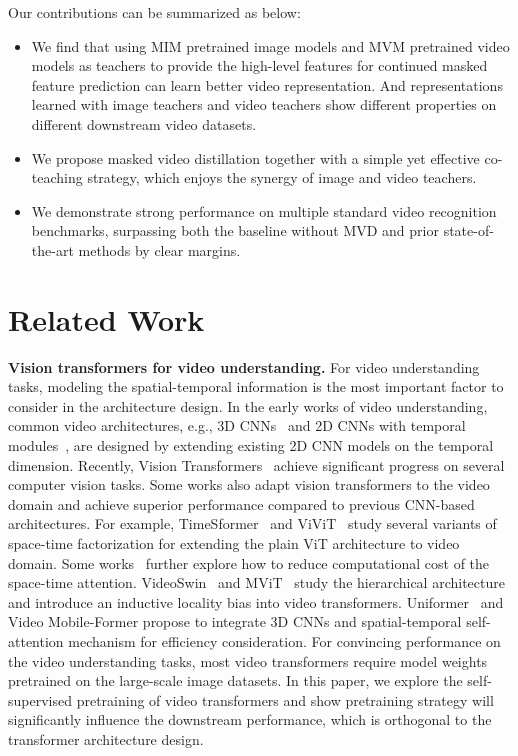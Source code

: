 \documentclass[10pt,twocolumn,letterpaper]{article}
\begin{document}
Our contributions can be summarized as below:
\begin{itemize}
    \item We find that using MIM pretrained image models and MVM pretrained video models as teachers to provide the high-level features for continued masked feature prediction can learn better video representation. And representations learned with image teachers and video teachers show different properties on different downstream video datasets.
    \item We propose masked video distillation together with a simple yet effective co-teaching strategy, which enjoys the synergy of image and video teachers.
    \item We demonstrate strong performance on multiple standard video recognition benchmarks, surpassing both the baseline without MVD and prior state-of-the-art methods by clear margins.
\end{itemize}
 

\section{Related Work}
\label{sec:related_work}

\vspace{0.05in}
\noindent \textbf{Vision transformers for video understanding.} For video understanding tasks, modeling the spatial-temporal information is the most important factor to consider in the architecture design. In the early works of video understanding, common video architectures, e.g., 3D CNNs~\cite{quovadis,c3d,r21d,slowfast,x3d} and 2D CNNs with temporal modules~\cite{recurrentdonahue,recurrentjoe,twostream,tsn,tsm}, are designed by extending existing 2D CNN models on the temporal dimension. Recently, Vision Transformers~\cite{vit,liu2021swin,dong2022cswin} achieve significant progress on several computer vision tasks. Some works also adapt vision transformers to the video domain and achieve superior performance compared to previous CNN-based architectures. For example, TimeSformer~\cite{timesformer} and ViViT~\cite{arnab2021vivit}   study several variants of space-time factorization for extending the plain ViT architecture to video domain. Some works~\cite{xvit,tokenlearner,patrick2021keeping} further explore how to reduce computational cost of the space-time attention. VideoSwin~\cite{liu2021video} and MViT~\cite{fan2021multiscale,mvitv2} study the hierarchical architecture and introduce an inductive locality bias into video transformers. Uniformer~\cite{li2022uniformer} and Video Mobile-Former \cite{wang2022video} propose to integrate 3D CNNs and spatial-temporal self-attention mechanism for efficiency consideration. For convincing performance on the video understanding tasks, most video transformers require model weights pretrained on the large-scale image datasets. In this paper, we explore the self-supervised pretraining of video transformers and show pretraining strategy will significantly influence the downstream performance, which is orthogonal to the transformer architecture design.
\end{document}
